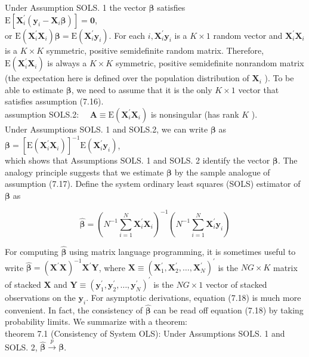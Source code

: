 \documentclass[10pt]{article}
\begin{document}
Under Assumption SOLS. 1 the vector $\boldsymbol{\beta}$ satisfies\\
$\mathrm{E}\left[\mathbf{X}_{i}^{\prime}\left(\mathbf{y}_{i}-\mathbf{X}_{i} \boldsymbol{\beta}\right)\right]=\mathbf{0}$,\\
or $\mathrm{E}\left(\mathbf{X}_{i}^{\prime} \mathbf{X}_{i}\right) \boldsymbol{\beta}=\mathrm{E}\left(\mathbf{X}_{i}^{\prime} \mathbf{y}_{i}\right)$. For each $i, \mathbf{X}_{i}^{\prime} \mathbf{y}_{i}$ is a $K \times 1$ random vector and $\mathbf{X}_{i}^{\prime} \mathbf{X}_{i}$ is a $K \times K$ symmetric, positive semidefinite random matrix. Therefore, $\mathrm{E}\left(\mathbf{X}_{i}^{\prime} \mathbf{X}_{i}\right)$ is always a $K \times K$ symmetric, positive semidefinite nonrandom matrix (the expectation here is defined over the population distribution of $\mathbf{X}_{i}$ ). To be able to estimate $\boldsymbol{\beta}$, we need to assume that it is the only $K \times 1$ vector that satisfies assumption (7.16).\\
assumption SOLS.2: $\quad \mathbf{A} \equiv \mathrm{E}\left(\mathbf{X}_{i}^{\prime} \mathbf{X}_{i}\right)$ is nonsingular (has rank $K$ ).\\
Under Assumptions SOLS. 1 and SOLS.2, we can write $\boldsymbol{\beta}$ as\\
$\boldsymbol{\beta}=\left[\mathrm{E}\left(\mathbf{X}_{i}^{\prime} \mathbf{X}_{i}\right)\right]^{-1} \mathrm{E}\left(\mathbf{X}_{i}^{\prime} \mathbf{y}_{i}\right)$,\\
which shows that Assumptions SOLS. 1 and SOLS. 2 identify the vector $\boldsymbol{\beta}$. The analogy principle suggests that we estimate $\boldsymbol{\beta}$ by the sample analogue of assumption (7.17). Define the system ordinary least squares (SOLS) estimator of $\boldsymbol{\beta}$ as


\begin{equation*}
\hat{\boldsymbol{\beta}}=\left(N^{-1} \sum_{i=1}^{N} \mathbf{X}_{i}^{\prime} \mathbf{X}_{i}\right)^{-1}\left(N^{-1} \sum_{i=1}^{N} \mathbf{X}_{i}^{\prime} \mathbf{y}_{i}\right) \tag{7.18}
\end{equation*}


For computing $\hat{\boldsymbol{\beta}}$ using matrix language programming, it is sometimes useful to write $\hat{\boldsymbol{\beta}}=\left(\mathbf{X}^{\prime} \mathbf{X}\right)^{-1} \mathbf{X}^{\prime} \mathbf{Y}$, where $\mathbf{X} \equiv\left(\mathbf{X}_{1}^{\prime}, \mathbf{X}_{2}^{\prime}, \ldots, \mathbf{X}_{N}^{\prime}\right)^{\prime}$ is the $N G \times K$ matrix of stacked $\mathbf{X}$ and $\mathbf{Y} \equiv\left(\mathbf{y}_{1}^{\prime}, \mathbf{y}_{2}^{\prime}, \ldots, \mathbf{y}_{N}^{\prime}\right)^{\prime}$ is the $N G \times 1$ vector of stacked observations on the $\mathbf{y}_{i}$. For asymptotic derivations, equation (7.18) is much more convenient. In fact, the consistency of $\hat{\boldsymbol{\beta}}$ can be read off equation (7.18) by taking probability limits. We summarize with a theorem:\\
theorem 7.1 (Consistency of System OLS): Under Assumptions SOLS. 1 and SOLS. 2, $\hat{\boldsymbol{\beta}} \xrightarrow{p} \boldsymbol{\beta}$.
\end{document}
